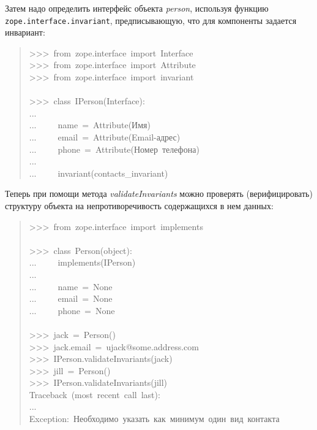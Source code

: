\documentclass[14pt,a4paper,openany,twoside,final]{extbook}
\providecommand*{\DUroletitlereference}[1]{\textsl{#1}}
\begin{document}
Затем надо определить интерфейс объекта \DUroletitlereference{person}, используя функцию
\texttt{zope.interface.invariant}, предписывающую, что для компоненты
задается инвариант:

\begin{quote}{\ttfamily \raggedright \noindent
>{}>{}>~from~zope.interface~import~Interface\\
>{}>{}>~from~zope.interface~import~Attribute\\
>{}>{}>~from~zope.interface~import~invariant\\
~\\
>{}>{}>~class~IPerson(Interface):\\
...\\
...~~~~~name~=~Attribute(\textquotedbl{}Имя\textquotedbl{})\\
...~~~~~email~=~Attribute(\textquotedbl{}Email-адрес\textquotedbl{})\\
...~~~~~phone~=~Attribute(\textquotedbl{}Номер~телефона\textquotedbl{})\\
...\\
...~~~~~invariant(contacts\_invariant)
}
\end{quote}

Теперь при помощи метода \DUroletitlereference{validateInvariants} можно проверять
(верифицировать) структуру объекта на непротиворечивость содержащихся
в нем данных:

\begin{quote}{\ttfamily \raggedright \noindent
>{}>{}>~from~zope.interface~import~implements\\
~\\
>{}>{}>~class~Person(object):\\
...~~~~~implements(IPerson)\\
...\\
...~~~~~name~=~None\\
...~~~~~email~=~None\\
...~~~~~phone~=~None\\
~\\
>{}>{}>~jack~=~Person()\\
>{}>{}>~jack.email~=~u\textquotedbl{}jack@some.address.com\textquotedbl{}\\
>{}>{}>~IPerson.validateInvariants(jack)\\
>{}>{}>~jill~=~Person()\\
>{}>{}>~IPerson.validateInvariants(jill)\\
Traceback~(most~recent~call~last):\\
...\\
Exception:~\textquotedbl{}Необходимо~указать~как~минимум~один~вид~контакта\textquotedbl{}
}
\end{quote}
\end{document}
